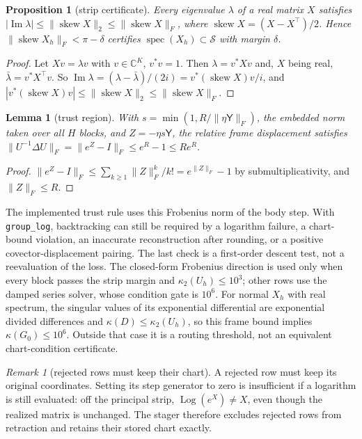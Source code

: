 \documentclass[11pt]{article}
\newtheorem{proposition}[theorem]{Proposition}
\newtheorem{lemma}[theorem]{Lemma}
\theoremstyle{definition}
\theoremstyle{remark}
\newtheorem{remark}[theorem]{Remark}
\providecommand{\C}{\mathbb{C}}
\providecommand{\Log}{\operatorname{Log}}
\providecommand{\Imag}{\operatorname{Im}}
\providecommand{\spec}{\operatorname{spec}}
\begin{document}
\begin{proposition}[strip certificate]\label{frame:prop:bendixson}
Every eigenvalue $\lambda$ of a real matrix $X$ satisfies $|\Imag \lambda|\le\|\operatorname{skew}X\|_2\le\|\operatorname{skew}X\|_F$, where $\operatorname{skew}X=(X-X^\top)/2$. Hence $\|\operatorname{skew}X_h\|_F<\pi-\delta$ certifies $\spec(X_h)\subset\mathcal{S}$ with margin $\delta$.
\end{proposition}
\begin{proof}
Let $Xv=\lambda v$ with $v\in\C^K$, $v^*v=1$. Then $\lambda=v^*Xv$ and, $X$ being real, $\bar\lambda=v^*X^\top v$. So $\Imag \lambda=(\lambda-\bar\lambda)/(2i)=v^*(\operatorname{skew}X)v/i$, and $|v^*(\operatorname{skew}X)v|\le\|\operatorname{skew}X\|_2\le\|\operatorname{skew}X\|_F$.
\end{proof}

\begin{lemma}[trust region]\label{frame:lem:trust}
With $s=\min(1,R/\|\eta\mathsf{Y}\|_F)$, the embedded norm taken over all $H$ blocks, and $Z=-\eta s\mathsf{Y}$, the relative frame displacement satisfies $\|U^{-1}\Delta U\|_F=\|e^Z-I\|_F\le e^{R}-1\le Re^R$.
\end{lemma}
\begin{proof}
$\|e^Z-I\|_F\le\sum_{k\ge1}\|Z\|_F^k/k!=e^{\|Z\|_F}-1$ by submultiplicativity, and $\|Z\|_F\le R$.
\end{proof}

The implemented trust rule uses this Frobenius norm of the body step. With \texttt{group\_log}, backtracking can still be required by a logarithm failure, a chart-bound violation, an inaccurate reconstruction after rounding, or a positive covector-displacement pairing. The last check is a first-order descent test, not a reevaluation of the loss. The closed-form Frobenius direction is used only when every block passes the strip margin and \(\kappa_2(U_h)\le10^3\); other rows use the damped series solver, whose condition gate is \(10^6\). For normal \(X_h\) with real spectrum, the singular values of its exponential differential are exponential divided differences and \(\kappa(D)\le\kappa_2(U_h)\), so this frame bound implies \(\kappa(G_0)\le10^6\). Outside that case it is a routing threshold, not an equivalent chart-condition certificate.

\begin{remark}[rejected rows must keep their chart]\label{frame:rem:rejected}
A rejected row must keep its original coordinates. Setting its step generator to zero is insufficient if a logarithm is still evaluated: off the principal strip, \(\Log(e^X)\ne X\), even though the realized matrix is unchanged. The stager therefore excludes rejected rows from retraction and retains their stored chart exactly.
\end{remark}
\end{document}
